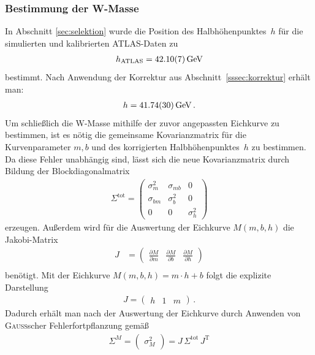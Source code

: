 \documentclass[11pt, a4paper]{article}
\numberwithin{equation}{section}
\begin{document}
\subsubsection{Bestimmung der W-Masse}
In Abschnitt \ref{sec:selektion} wurde die Position des Halbhöhenpunktes~$h$ für die simulierten und kalibrierten ATLAS-Daten zu
\begin{align*}
	h_\mathrm{ATLAS} = \SI{42.10 +- 0.07}{\GeV}
\end{align*}
bestimmt.
Nach Anwendung der Korrektur aus Abschnitt~\ref{sssec:korrektur} erhält man:
\begin{align*}
	h = \SI{41.74 +- 0.30}{\GeV} \, \text{.}
\end{align*}
Um schließlich die W-Masse mithilfe der zuvor angepassten Eichkurve zu bestimmen, ist es nötig die gemeinsame Kovarianzmatrix für die Kurvenparameter $m, b$ und des korrigierten Halbhöhenpunktes~$h$ zu bestimmen.
Da diese Fehler unabhängig sind, lässt sich die neue Kovarianzmatrix durch Bildung der Blockdiagonalmatrix
\begin{align*}
	\Sigma^\mathrm{tot} = \begin{pmatrix}
		\sigma_m^2  & \sigma_{mb} & 0 \\
		\sigma_{bm} & \sigma_b^2  & 0 \\
		0           & 0           & \sigma_h^2
	\end{pmatrix}
\end{align*}
erzeugen.
Außerdem wird für die Auswertung der Eichkurve $M(m, b, h)$ die Jakobi-Matrix
\begin{align*}
	J &= \begin{pmatrix}
	\frac{\partial M}{\partial m} &
	\frac{\partial M}{\partial b} &
	\frac{\partial M}{\partial h}
	\end{pmatrix} \\
\end{align*}
benötigt.
Mit der Eichkurve $M(m, b, h) = m \cdot h + b$ folgt die explizite Darstellung
\begin{align*}
	J=\begin{pmatrix}
	h & 1 & m
	\end{pmatrix} \, \text{.}
\end{align*}
Dadurch erhält man nach der Auswertung der Eichkurve durch Anwenden von \textsc{Gauß}scher Fehlerfortpflanzung gemäß \cite{error_prop}
\begin{align*}
	\Sigma^M = \begin{pmatrix}
	\sigma_{M}^2
	\end{pmatrix} = J \, \Sigma^\mathrm{tot} \, J^\mathrm{T}
\end{align*}
\end{document}
